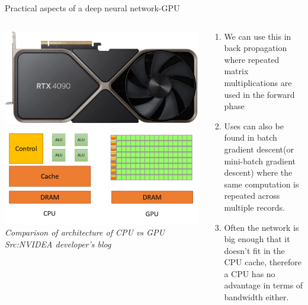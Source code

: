 \begin{frame}{Practical aspects of a deep neural network-GPU}
	\begin{columns}[T]
        \begin{column}{0.4\textwidth}
        	\includegraphics[width=\textwidth]{images/RTX.jpg}
			\includegraphics[width=\textwidth]{images/GPUvsCPU.png}
			\tiny{\textit{Comparison of architecture of CPU vs GPU\\ Src:NVIDEA developer's blog}}
        \end{column}
	    \begin{column}{0.6\textwidth} 
			\begin{enumerate}[$\bullet$]
				\item We can use this in back propagation where repeated matrix multiplications are used in the forward phase\pause
				\item Uses can also be found in batch gradient descent(or mini-batch gradient descent) where the same computation is repeated across multiple records.\pause
				\item Often the network is big enough that it doesn't fit in the CPU cache, therefore a CPU has no advantage in terms of bandwidth either. 
			\end{enumerate}
    	\end{column}
    \end{columns}
\end{frame}
